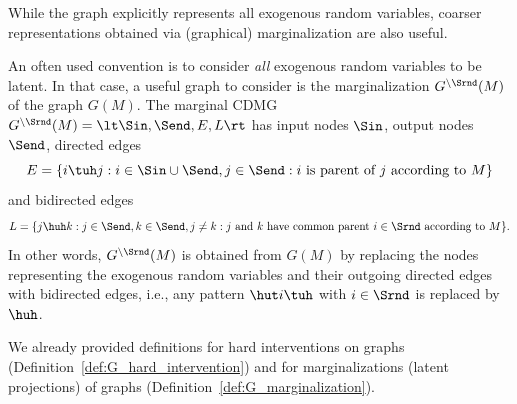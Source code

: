 While the graph explicitly represents all exogenous random variables, coarser
representations obtained via (graphical) marginalization are also useful.
\begin{Rem}
  An often used convention is to consider \emph{all} exogenous random variables to be latent. 
  In that case, a useful graph
  to consider is the marginalization $G^{\setminus \Srnd}(M)$ of the graph $G(M)$. 
  The marginal CDMG $G^{\setminus \Srnd}(M) = \lt \Sin, \Send, E, L \rt$ has
  input nodes $\Sin$, output nodes $\Send$, directed edges
  $$E = \{i \tuh j : i \in \Sin\cup\Send, j\in\Send: \text{$i$ is parent of $j$ according to $M$}\}$$
  and bidirected edges
  $$L = \{j \huh k : j \in \Send, k \in \Send, j \ne k: \text{$j$ and $k$ have common parent $i\in\Srnd$ according to $M$}\}.$$
  In other words, $G^{\setminus \Srnd}(M)$ is obtained from $G(M)$ by replacing the nodes representing the exogenous random
  variables and their outgoing directed edges with bidirected edges, i.e.,
  any pattern $\hut i \tuh$ with $i \in \Srnd$ is replaced by $\huh$.
\end{Rem}

We already provided definitions for hard interventions on graphs (Definition~\ref{def:G_hard_intervention})
and for marginalizations (latent projections) of graphs (Definition~\ref{def:G_marginalization}). 

